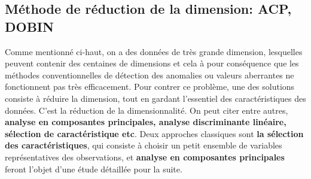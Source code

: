 \subsection{Méthode de réduction de la dimension: ACP, DOBIN}
%
Comme mentionné ci-haut, on a des données de très grande dimension, lesquelles peuvent contenir des centaines de dimensions et cela à pour conséquence  que les méthodes conventionnelles de  détection des anomalies ou valeurs aberrantes ne fonctionnent pas très efficacement. Pour contrer ce problème, une des solutions consiste à réduire la dimension, tout en gardant l'essentiel des caractéristiques des données. C'est la réduction de la dimensionnalité. On peut citer entre autres,\textbf{ analyse en composantes principales,  analyse discriminante linéaire, sélection de caractéristique etc}. Deux approches classiques sont \textbf{la sélection des caractéristiques}, qui consiste à choisir un petit ensemble de variables représentatives des observations, et \textbf{analyse en composantes principales} feront l'objet d'une étude détaillée pour la suite.
%
